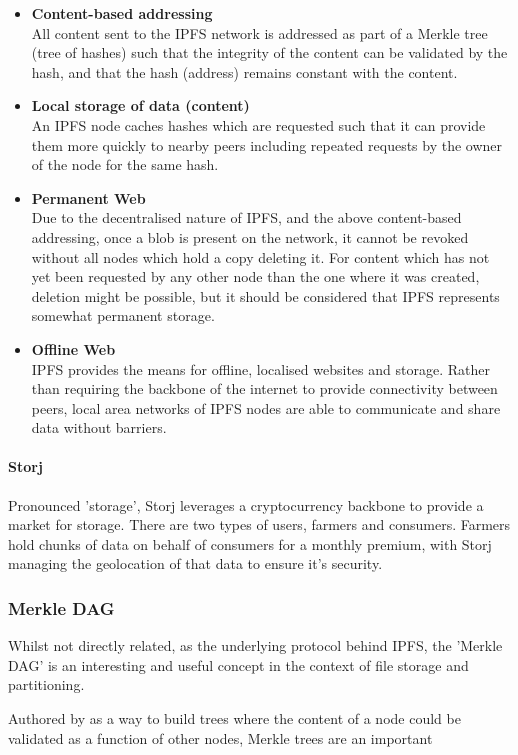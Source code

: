 \begin{itemize}
	\item 
    	\textbf{Content-based addressing} \\
        All content sent to the IPFS network is addressed as part of a Merkle tree (tree of hashes) such that the integrity of the content can be validated by the hash, and that the hash (address) remains constant with the content.
    \item 
    	\textbf{Local storage of data (content)} \\
        An IPFS node caches hashes which are requested such that it can provide them more quickly to nearby peers including repeated requests by the owner of the node for the same hash.
    \item 
    	\textbf{Permanent Web} \\
        Due to the decentralised nature of IPFS, and the above content-based addressing, once a blob is present on the network, it cannot be revoked without all nodes which hold a copy deleting it. For content which has not yet been requested by any other node than the one where it was created, deletion might be possible, but it should be considered that IPFS represents somewhat permanent storage.
    \item
    	\textbf{Offline Web} \\
        IPFS provides the means for offline, localised websites and storage. Rather than requiring the backbone of the internet to provide connectivity between peers, local area networks of IPFS nodes are able to communicate and share data without barriers.
\end{itemize}

\paragraph{Storj}

Pronounced 'storage', Storj leverages a cryptocurrency backbone to provide a market for storage. There are two types of users, farmers and consumers. Farmers hold chunks of data on behalf of consumers for a monthly premium, with Storj managing the geolocation of that data to ensure it's security.

\subsubsection{Merkle DAG}

Whilst not directly related, as the underlying protocol behind IPFS, the 'Merkle DAG' is an interesting and useful concept in the context of file storage and partitioning.

Authored by \cite{merkle:1988:inbook} as a way to build trees where the content of a node could be validated as a function of other nodes, Merkle trees are an important 

